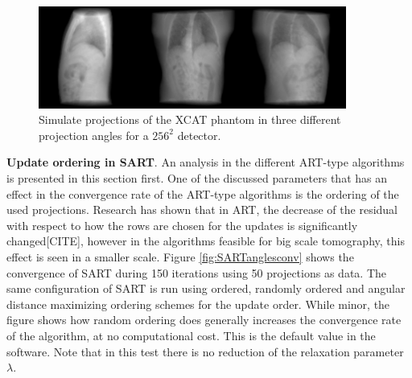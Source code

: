 \begin{figure}[h]
\begin{center}

\includegraphics[width=0.9\textwidth]{Applications/XCATproj.png} 
\end{center}

\caption[Simulate projections of the XCAT phantom]{\label{fig:XCATproj} Simulate projections of the XCAT phantom in three different projection angles for a $256^2$ detector.} 
\end{figure}

\textbf{Update ordering in SART}. An analysis in the different ART-type algorithms is presented in this section first. One of the discussed parameters that has an effect in the convergence rate of the ART-type algorithms is the ordering of the used projections. Research has shown that in ART, the decrease of the residual with respect to how the rows are chosen for the updates is significantly changed[CITE], however in the algorithms feasible for big scale tomography, this effect is seen in a smaller scale. Figure \ref{fig:SARTanglesconv} shows the convergence of SART during 150 iterations using 50 projections as data. The same configuration of SART is run using ordered, randomly ordered and angular distance maximizing ordering schemes for the update order. While minor, the figure shows how random ordering does generally increases the convergence rate of the algorithm, at no computational cost. This is the default value in the software. Note that in this test there is no reduction of the relaxation parameter $\lambda$.


